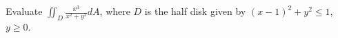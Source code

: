 Evaluate $\displaystyle{\iint_{D} \frac{x^3}{x^2+y^2} dA}$, where $D$ is the
half disk given by $(x - 1)^2 + y^2 \le 1$, $y \ge 0$.
